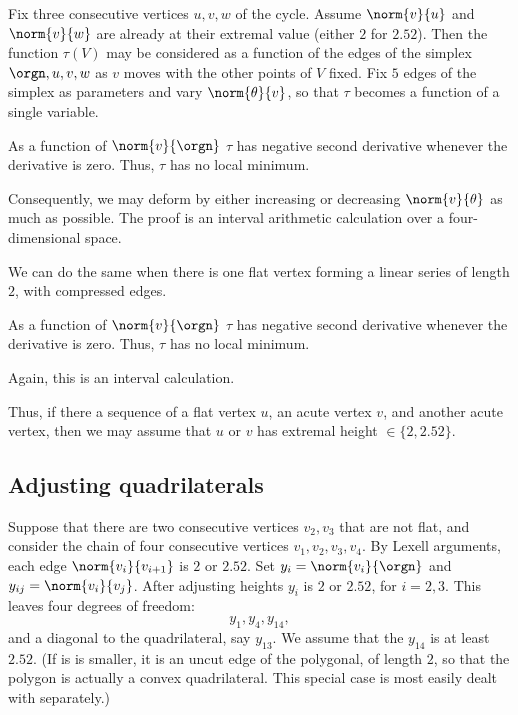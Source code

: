 Fix three consecutive vertices $u,v,w$ of the cycle.
Assume $\norm{v}{u}$ and $\norm{v}{w}$ are already at their extremal value (either $2$ for  $2.52$).  Then the function $\tau(V)$ may be considered as a function
of the edges of the simplex $\orgn,u,v,w$ as $v$ moves with the other points of $V$ fixed.  Fix $5$ edges of the simplex as parameters and vary $\norm{\theta}{v}$, so that $\tau$ becomes a function of a single variable.

\begin{lemma} As a function of $\norm{v}{\orgn}$
 $\tau$ has negative second derivative whenever the derivative is zero.  Thus, $\tau$ has no local minimum.
\end{lemma}

Consequently, we may deform by either increasing or decreasing $\norm{v}{\theta}$ as much as possible.  The proof is an interval arithmetic calculation over a four-dimensional space.


We can do the same when there is one flat vertex forming a linear series of length $2$, with compressed edges.

\begin{lemma}
As a function of $\norm{v}{\orgn}$
 $\tau$ has negative second derivative whenever the derivative is zero.  Thus, $\tau$ has no local minimum.
\end{lemma}

Again, this is an interval calculation.

Thus, if there a sequence of a flat vertex $u$, an acute vertex $v$, and another acute vertex, then we may assume that $u$ or $v$ has extremal height $\in\{2,2.52\}$.



\subsection{Adjusting quadrilaterals}

Suppose that there are two consecutive vertices $v_2,v_3$ that are not flat,
and consider the chain of four consecutive vertices $v_1,v_2,v_3,v_4$.
By Lexell arguments, each edge $\norm{v_i}{v_{i+1}}$ is $2$ or $2.52$.
Set $y_i = \norm{v_i}{\orgn}$ and $y_{ij} = \norm{v_i}{v_j}$.
After adjusting heights $y_i$ is $2$ or $2.52$, for $i=2,3$.
This leaves four degrees of freedom:
$$
y_1,y_4,y_{14},
$$
and a diagonal to the quadrilateral, say $y_{13}$.
We assume that the $y_{14}$ is at least $2.52$.  (If is is smaller, it is an uncut edge of the polygonal, of length $2$, so that the polygon is actually a convex quadrilateral.  This special case is most easily dealt with separately.)

